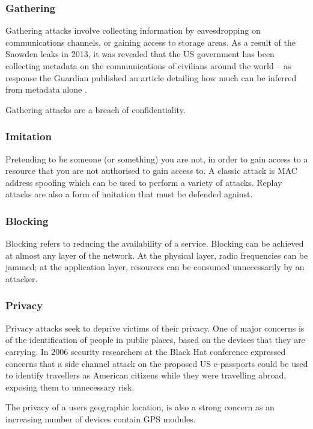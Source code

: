 \documentclass[10pt,journal,compsoc]{IEEEtran}
\begin{document}
\subsubsection{Gathering}
Gathering attacks involve collecting information by eavesdropping on
communications channels, or gaining access to storage areas. As a result of the
Snowden leaks in 2013, it was revealed that the US government has been
collecting metadata on the communications of civilians around the world -- as
response the Guardian published an article detailing how much can be inferred
from metadata alone \cite{Guardian2013}. 

Gathering attacks are a breach of confidentiality. 

\subsubsection{Imitation}
Pretending to be someone (or something) you are not, in order to gain access to
a resource that you are not authorised to gain access to. A classic attack is
MAC address spoofing which can be used to perform a variety of attacks. Replay
attacks are also a form of imitation that must be defended against. 

\subsubsection{Blocking}
Blocking refers to reducing the availability of a service. Blocking can be
achieved at almost any layer of the network. At the physical layer, radio
frequencies can be jammed; at the application layer, resources can be consumed
unnecessarily by an attacker.  

\subsubsection{Privacy}
Privacy attacks seek to deprive victims of their privacy. One of major concerns
is of the identification of people in public places, based on the devices that
they are carrying. In 2006 security researchers at the Black Hat conference
\cite{Flexilis2006} expressed concerns that a side channel attack on the
proposed US e-passports could be used to identify travellers as American
citizens while they were travelling abroad, exposing them to unnecessary risk.

The privacy of a users geographic location, is also a strong concern as an
increasing number of devices contain GPS modules. 
\end{document}
